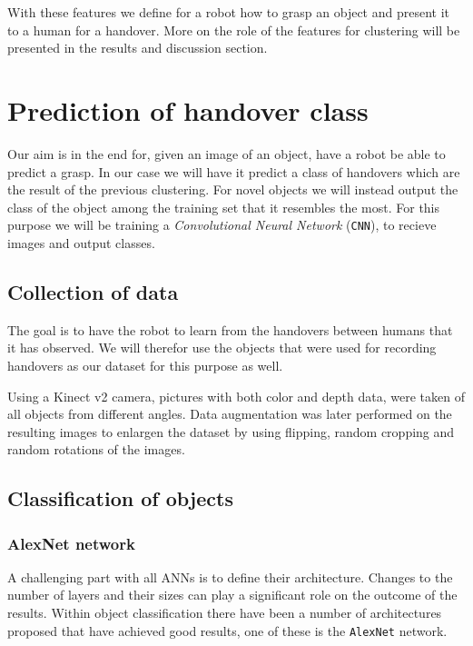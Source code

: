 With these features we define for a robot how to grasp an object and present it to a human for a handover. More on the role of the features for clustering will be presented in the results and discussion section.


\section{Prediction of handover class}

Our aim is in the end for, given an image of an object, have a robot be able to predict a grasp. In our case we will have it predict a class of handovers which are the result of the previous clustering. For novel objects we will instead output the class of the object among the training set that it resembles the most. For this purpose we will be training a \emph{Convolutional Neural Network} (\texttt{CNN}), to recieve images and output classes.

\subsection{Collection of data}

The goal is to have the robot to learn from the handovers between humans that it has observed. We will therefor use the objects that were used for recording handovers as our dataset for this purpose as well.

Using a Kinect v2 camera, pictures with both color and depth data, were taken of all objects from different angles. Data augmentation was later performed on the resulting images to enlargen the dataset by using flipping, random cropping and random rotations of the images.

\subsection{Classification of objects}

\subsubsection{AlexNet network}

A challenging part with all ANNs is to define their architecture. Changes to the number of layers and their sizes can play a significant role on the outcome of the results. Within object classification there have been a number of architectures proposed that have achieved good results, one of these is the \texttt{AlexNet} network.

